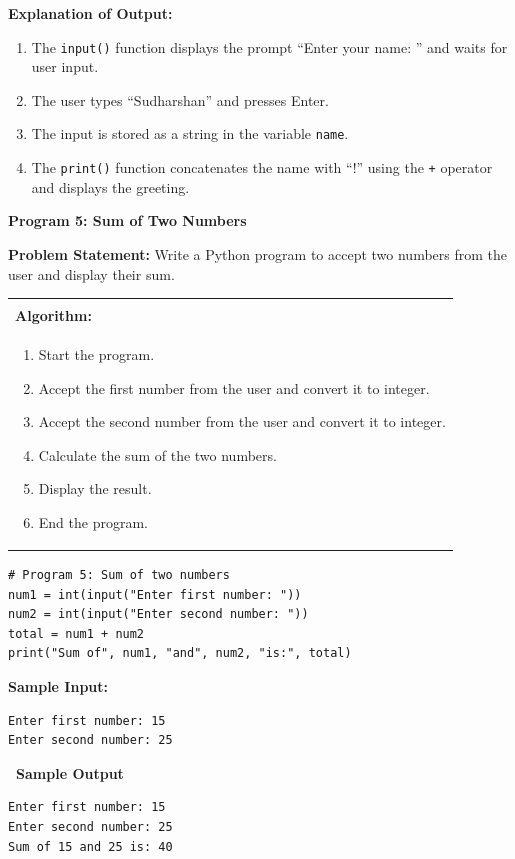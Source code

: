 \documentclass[12pt,a4paper]{article}
\makeatletter
\newcommand{\outhead}{\noindent\colorbox{cmrgreen!25}%
  {\textbf{\small\color{cmrdark}~Sample Output~}}\par\vspace{-1pt}}
\newenvironment{algobox}{%
  \par\vspace{4pt}%
  \noindent\begin{tabular}{@{}p{\linewidth}@{}}%
  \hline\\[-8pt]%
  \textbf{\color{blue!60!black}\small Algorithm:}\\[2pt]%
}{%
  \\[-4pt]\hline%
  \end{tabular}\par\vspace{4pt}%
}
\makeatother
\begin{document}
\textbf{Explanation of Output:}
\begin{enumerate}
  \item The \texttt{input()} function displays the prompt ``Enter your name: '' and waits for user input.
  \item The user types ``Sudharshan'' and presses Enter.
  \item The input is stored as a string in the variable \texttt{name}.
  \item The \texttt{print()} function concatenates the name with ``!'' using the \texttt{+} operator and displays the greeting.
\end{enumerate}

\vspace{0.5cm}

\textbf{Program 5: Sum of Two Numbers}

\textbf{Problem Statement:}
Write a Python program to accept two numbers from the user and display their sum.

\begin{algobox}
\begin{enumerate}[label=Step \arabic*:]
  \item Start the program.
  \item Accept the first number from the user and convert it to integer.
  \item Accept the second number from the user and convert it to integer.
  \item Calculate the sum of the two numbers.
  \item Display the result.
  \item End the program.
\end{enumerate}
\end{algobox}

\begin{lstlisting}
# Program 5: Sum of two numbers
num1 = int(input("Enter first number: "))
num2 = int(input("Enter second number: "))
total = num1 + num2
print("Sum of", num1, "and", num2, "is:", total)
\end{lstlisting}

\textbf{Sample Input:}
\begin{verbatim}
Enter first number: 15
Enter second number: 25
\end{verbatim}

\outhead
\begin{lstlisting}[style=outputstyle]
Enter first number: 15
Enter second number: 25
Sum of 15 and 25 is: 40
\end{lstlisting}
\end{document}
